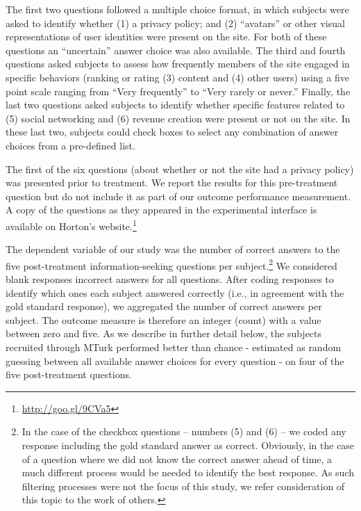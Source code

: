 \documentclass{cscw2010}
\begin{document}
The first two questions followed a multiple choice format, in which
subjects were asked to identify whether (1) a privacy policy; and (2)
``avatars'' or other visual representations of user identities were
present on the site. For both of these questions an ``uncertain''
answer choice was also available. The third and fourth questions asked
subjects to assess how frequently members of the site engaged in
specific behaviors (ranking or rating (3) content and (4) other users)
using a five point scale ranging from ``Very frequently'' to ``Very
rarely or never.''  Finally, the last two questions asked subjects to
identify whether specific features related to (5) social networking
and (6) revenue creation were present or not on the site. In these
last two, subjects could check boxes to select any combination of
answer choices from a pre-defined list.

The first of the six questions (about whether or not the site had a
privacy policy) was presented prior to treatment. We report the
results for this pre-treatment question but do not include it as part
of our outcome performance measurement.  A copy of the questions as they appeared in the experimental interface is
available on Horton's website.\footnote{\href{http://goo.gl/9CVa5}{http://goo.gl/9CVa5}
}


The dependent variable of our study was the number of correct answers
to the five post-treatment information-seeking questions per
subject.\footnote{In the case of the checkbox questions -- numbers (5)
  and (6) -- we coded any response including the gold standard answer
  as correct. Obviously, in the case of a question where we did not
  know the correct answer ahead of time, a much different process
  would be needed to identify the best response. As such filtering
  processes were not the focus of this study, we refer consideration
  of this topic to the work of others.\cite{snow2008cheap}} We
considered blank responses incorrect answers for all questions. After
coding responses to identify which ones each subject answered correctly
(i.e., in agreement with the gold standard response), we aggregated
the number of correct answers per subject. The outcome measure is
therefore an integer (count) with a value between zero and five. As we
describe in further detail below, the subjects recruited through MTurk performed
better than chance - estimated as random guessing between all
available answer choices for every question - on four of the five
post-treatment questions.
\end{document}
